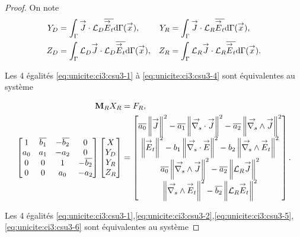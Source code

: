 \begin{proof}
    On note
    \begin{align*}
      Y_D &= \int_\Gamma \vJ \cdot \LD \conj{\vE_t}\dd{\Gamma}(\vx),  &
      Y_R &= \int_\Gamma \vJ \cdot \LR \conj{\vE_t} \dd{\Gamma}(\vx),
      \\
      Z_D &= \int_\Gamma \LD \vJ \cdot \LD \conj{\vE_t}\dd{\Gamma}(\vx),  &
      Z_R &= \int_\Gamma \LR \vJ \cdot \LR \conj{\vE_t} \dd{\Gamma}(\vx).
    \end{align*}

    Les 4 égalités \eqref{eq:unicite:ci3:csu3-1} à \eqref{eq:unicite:ci3:csu3-4} sont équivalentes au système

    \begin{align*}
      \mM_R X_R &= F_R,
      \\
      \begin{bmatrix}
        1 & \conj{b_1} & -\conj{b_2} & 0
        \\
        a_0 & a_1 & -a_2 & 0
        \\
        0 & 0 & 1 & -\conj{b_2}
        \\
        0 & 0 & a_0 & -a_2
        \\
      \end{bmatrix}
      \begin{bmatrix}
        X\\
        Y_D\\
        Y_R\\
        Z_R
      \end{bmatrix}
      &=
      \begin{bmatrix}
        \conj{a_0} \norm{\vJ}^2 - \conj{a_1} \norm{\vdivs \vJ}^2 - \conj{a_2} \norm{\vrots \vJ}^2
        \\
        \norm{\vE_t}^2  - b_1 \norm{\vdivs \vE}^2  - b_2 \norm{\vrots \vE_t}^2
        \\
        \conj{a_0} \norm{\vrots \vJ}^2 - \conj{a_2} \norm{\LR \vJ}^2
        \\
        \norm{\vrots \vE_t}^2 - \conj{b_2} \norm{\LR \vE_t}^2
      \end{bmatrix}.
    \end{align*}
    
    Les 4 égalités \eqref{eq:unicite:ci3:csu3-1},\eqref{eq:unicite:ci3:csu3-2},\eqref{eq:unicite:ci3:csu3-5},\eqref{eq:unicite:ci3:csu3-6} sont équivalentes au système


\end{proof}
